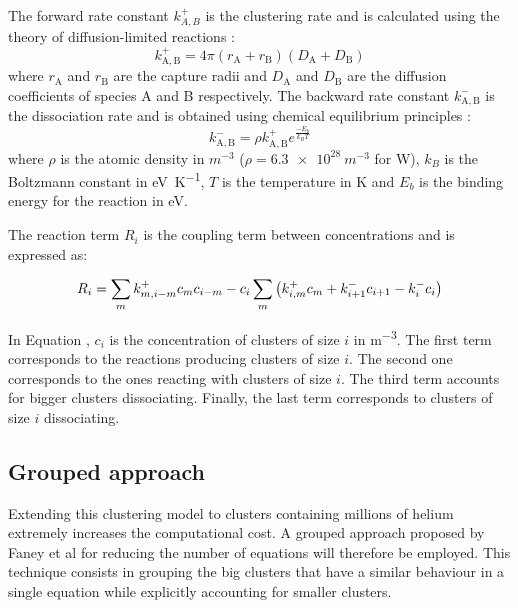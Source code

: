 The forward rate constant $k^+_{A,B}$ is the clustering rate and is calculated using the theory of diffusion-limited reactions :
\begin{equation}
    k^+_\mathrm{A,B} = 4 \pi (r_\mathrm{A} + r_\mathrm{B}) (D_\mathrm{A} + D_\mathrm{B})
\end{equation}
where $r_\mathrm{A}$ and $r_\mathrm{B}$ are the capture radii and $D_\mathrm{A}$ and $D_\mathrm{B}$ are the diffusion coefficients of species A and B respectively.
The backward rate constant $k^-_\mathrm{A,B}$ is the dissociation rate and is obtained using chemical equilibrium principles \cite{goldstein_diffusion_2007}:
\begin{equation}
    k^-_\mathrm{A,B} =\rho k^+_\mathrm{A,B}e^{\frac{-E_b}{k_B T}}
\end{equation}
where $\rho$ is the atomic density in $\si{m^{-3}}$ ($\rho = \SI{6.3e28}{m^{-3}}$ for W), $k_B$ is the Boltzmann constant in \si{eV.K^{-1}}, $T$ is the temperature in \si{K} and $E_b$ is the binding energy for the reaction  in \si{eV}.

The reaction term $R_i$ is the coupling term between concentrations and is expressed as:

\begin{equation}
    R_i=  \sum_{m} k^+_{m,i-m} c_m c_{i-m}  - c_i \sum_m \left( k_{i, m}^+ c_{m} + k_{i+1}^- c_{i+1} -  k_i^- c_i \right)
    \labeq{reaction term}
\end{equation}


In Equation , $c_i$ is the concentration of clusters of size $i$ in \si{m^{-3}}.
The first term corresponds to the reactions producing clusters of size $i$.
The second one corresponds to the ones reacting with clusters of size $i$.
The third term accounts for bigger clusters dissociating.
Finally, the last term corresponds to clusters of size $i$ dissociating.

\subsection{Grouped approach}
Extending this clustering model to clusters containing millions of helium extremely increases the computational cost.
A grouped approach proposed by Faney et al  for reducing the number of equations will therefore be employed.
This technique consists in grouping the big clusters that have a similar behaviour in a single equation while explicitly accounting for smaller clusters.

